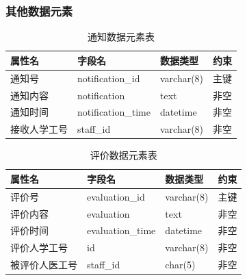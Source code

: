\documentclass{article}
\begin{document}
\subsubsection{其他数据元素}

\begin{table}[H]
    \centering
    \begin{tabularx}{\textwidth}{|>{\raggedright\arraybackslash}X|>{\raggedright\arraybackslash}X|>{\raggedright\arraybackslash}X|>{\raggedright\arraybackslash}X|}
    \toprule
    \textbf{属性名} & \textbf{字段名} & \textbf{数据类型} & \textbf{约束} \\ \midrule
    通知号 & notification\_id & varchar(8) & 主键 \\ \midrule
    通知内容 & notification & text & 非空 \\ \midrule
    通知时间 & notification\_time & datetime & 非空 \\ \midrule
    接收人学工号 & staff\_id & varchar(8) & 非空 \\ \bottomrule
    \end{tabularx}
    \caption{通知数据元素表}
    \label{tab:notification_elements}   
\end{table}

\begin{table}[H]
    \centering
    \begin{tabularx}{\textwidth}{|>{\raggedright\arraybackslash}X|>{\raggedright\arraybackslash}X|>{\raggedright\arraybackslash}X|>{\raggedright\arraybackslash}X|}
    \toprule
    \textbf{属性名} & \textbf{字段名} & \textbf{数据类型} & \textbf{约束} \\ \midrule
    评价号 & evaluation\_id & varchar(8) & 主键 \\ \midrule
    评价内容 & evaluation & text & 非空 \\ \midrule
    评价时间 & evaluation\_time & datetime & 非空 \\ \midrule
    评价人学工号 & id & varchar(8) & 非空 \\ \midrule
    被评价人医工号 & staff\_id & char(5) & 非空 \\ \bottomrule
    \end{tabularx}
    \caption{评价数据元素表}
    \label{tab:evaluation_elements}
\end{table}
\end{document}
